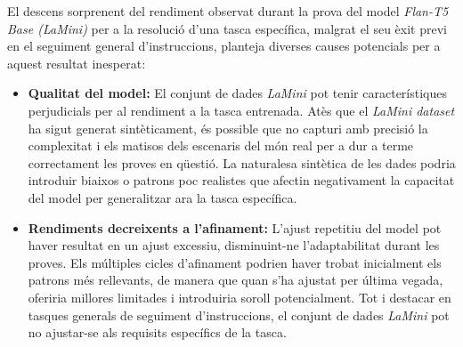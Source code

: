 El descens sorprenent del rendiment observat durant la prova del model \textit{Flan-T5 Base (LaMini)} per a la resolució d'una tasca específica, malgrat el seu èxit previ en el seguiment general d'instruccions, planteja diverses causes potencials per a aquest resultat inesperat:

\begin{itemize}
  \item \textbf{Qualitat del model:} El conjunt de dades \textit{LaMini} pot tenir característiques perjudicials per al rendiment a la tasca entrenada. Atès que el \textit{LaMini dataset} ha sigut generat sintèticament, és possible que no capturi amb precisió la complexitat i els matisos dels escenaris del món real per a dur a terme correctament les proves en qüestió. La naturalesa sintètica de les dades podria introduir biaixos o patrons poc realistes que afectin negativament la capacitat del model per generalitzar ara la tasca específica.
  \item \textbf{Rendiments decreixents a l'afinament:} L'ajust repetitiu del model pot haver resultat en un ajust excessiu, disminuint-ne l'adaptabilitat durant les proves. Els múltiples cicles d'afinament podrien haver trobat inicialment els patrons més rellevants, de manera que quan s'ha ajustat per última vegada, oferiria millores limitades i introduiria soroll potencialment. Tot i destacar en tasques generals de seguiment d'instruccions, el conjunt de dades \textit{LaMini} pot no ajustar-se als requisits específics de la tasca.
\end{itemize}


